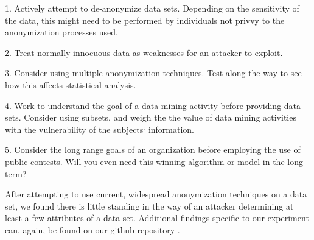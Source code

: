 \documentclass[10pt,journal,compsoc]{IEEEtran}
\begin{document}
1. Actively attempt to de-anonymize data sets.  Depending on the sensitivity of the data, this might need to be performed by individuals not privvy to the anonymization processes used.\linebreak

2.  Treat normally innocuous data as weaknesses for an attacker to exploit. \linebreak

3.  Consider using multiple anonymization techniques.  Test along the way to see how this affects statistical analysis.\linebreak

4.  Work to understand the goal of a data mining activity before providing data sets. Consider using subsets, and weigh the the value of data mining activities with the vulnerability of the subjects` information.\linebreak

5.  Consider the long range goals of an organization before employing the use of public contests.  Will you even need this winning algorithm or model in the long term?\linebreak

After attempting to use current, widespread anonymization techniques on a data set, we found there is little standing in the way of an attacker determining at least a few attributes of a data set.  Additional findings specific to our experiment can, again, be found on our github repository \cite{frye}.
%
%
\end{document}
